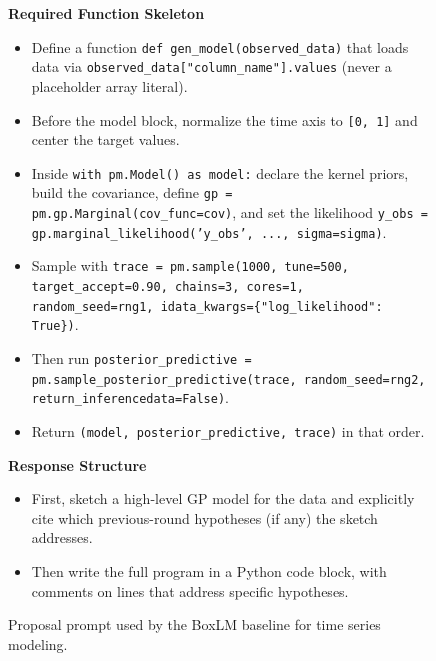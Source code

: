 \documentclass{article}
\begin{document}
\begin{figure}[h]
\begin{mdframed}[linecolor=gray!50, backgroundcolor=gray!5, linewidth=0.8pt]
\medskip
\textbf{Required Function Skeleton}
\begin{itemize}[leftmargin=*, nosep]
    \item Define a function \texttt{def gen\_model(observed\_data)} that
          loads data via \texttt{observed\_data["column\_name"].values}
          (never a placeholder array literal).
    \item Before the model block, normalize the time axis to
          \texttt{[0, 1]} and center the target values.
    \item Inside \texttt{with pm.Model() as model:} declare the kernel
          priors, build the covariance, define
          \texttt{gp = pm.gp.Marginal(cov\_func=cov)}, and set the
          likelihood
          \texttt{y\_obs = gp.marginal\_likelihood('y\_obs', ..., sigma=sigma)}.
    \item Sample with
          \texttt{trace = pm.sample(1000, tune=500, target\_accept=0.90,
          chains=3, cores=1, random\_seed=rng1,
          idata\_kwargs=\{"log\_likelihood": True\})}.
    \item Then run \texttt{posterior\_predictive =
          pm.sample\_posterior\_predictive(trace, random\_seed=rng2,
          return\_inferencedata=False)}.
    \item Return \texttt{(model, posterior\_predictive, trace)} in that
          order.
\end{itemize}

\medskip
\textbf{Response Structure}
\begin{itemize}[leftmargin=*, nosep]
    \item First, sketch a high-level GP model for the data and explicitly
          cite which previous-round hypotheses (if any) the sketch
          addresses.
    \item Then write the full program in a Python code block, with comments
          on lines that address specific hypotheses.
\end{itemize}

\end{mdframed}
\caption{Proposal prompt used by the BoxLM baseline for time series modeling.}
\label{fig:boxlm-proposal-time-series-prompt}
\end{figure}
\end{document}
